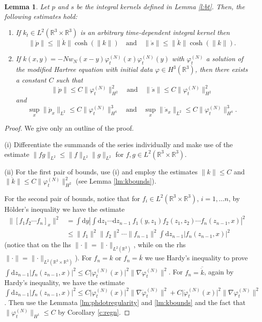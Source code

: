 \documentclass[11pt,a4paper,DIV11]{scrartcl}	%
\newtheorem{lem}[thm]{Lemma}
\newcommand{\di}{\textrm{d}}		%
\newcommand{\cc}[1]{\overline{#1}}	%
\newcommand{\Rbb}{\mathbb{R}}		%
\newcommand{\norm}[1]{\lVert#1\rVert}	%
\newcommand{\ph}{\varphi_t^{(N)}}	%
\newcommand{\phdot}{\dot{\varphi}_t^{(N)}}	%
\newcommand{\bd}{\begin{displaymath}}			%
\newcommand{\ed}{\end{displaymath}}
\begin{document}
\begin{lem}
\label{lem:dottedests1}
Let $p$ and $s$ be the integral kernels defined in Lemma \ref{l:bt}. Then, the following estimates hold:
\begin{enumerate}
\item If $k_t \in L^2(\Rbb^3\times\Rbb^3)$ is an arbitrary time-dependent integral kernel then
\bd
\norm{\dot p} \leq \norm{\dot k} \cosh(\norm{k}) \quad \mbox{and} \quad \norm{\dot s} \leq \norm{\dot k} \cosh(\norm{k}).
\ed
\item If $k(x,y) = - N w_N(x-y) \ph(x) \ph(y)$ with $\ph$ a solution of the modified Hartree equation with initial data $\varphi \in H^3(\Rbb^3)$, then there exists a constant $C$ such that
\bd
\norm{\dot p} \leq C \norm{\ph}_{H^2}^2 \quad \mbox{and} \quad \norm{\dot s} \leq C \norm{\ph}_{H^2}^2
\ed
and
\bd
\sup_x \norm{\dot p_x}_{L^2} \leq C \norm{\ph}_{H^4}^3 \quad \mbox{and} \quad \sup_x \norm{\dot s_x}_{L^2} \leq C \norm{\ph}_{H^4}^3.
\ed
\end{enumerate}
\end{lem}
\begin{proof}
We give only an outline of the proof.

(i) Differentiate the summands of the series individually and make use of the estimate $\norm{fg}_{L^2} \leq \norm{f}_{L^2} \norm{g}_{L^2}$ for $f,g \in L^2(\Rbb^3\times \Rbb^3)$.

(ii) For the first pair of bounds, use (i) and employ the estimates $\norm{k} \leq C$ and $\norm{\dot k} \leq C \norm{\ph}_{H^2}^2$ (see Lemma \ref{lm:kbounds}).

For the second pair of bounds, notice that for $f_i \in L^2(\Rbb^3 \times \Rbb^3)$, $i=1,\dots n$, by H\"older's inequality we have the estimate
\begin{align*}
\norm{\left[ f_1 f_2 \cdots f_n\right]_x}^2 & = \int \di y \left\lvert \int \di z_1 \cdots \di z_{n-1}\ f_1(y,z_1) f_2(z_1,z_2) \cdots f_n(z_{n-1},x) \right\rvert^2 \\
& \leq \norm{f_1}^2 \norm{f_2}^2 \cdots \norm{f_{n-1}}^2 \int \di z_{n-1} \lvert f_n(z_{n-1},x) \rvert^2 
\end{align*}
(notice that on the lhs $\norm{\cdot}= \norm{\cdot}_{L^2(\Rbb^3)}$, while on the rhs $\norm{\cdot} = \norm{\cdot}_{L^2(\Rbb^3\times\Rbb^3)}$).
For $f_n = k$ or $f_n = \cc{k}$ we use Hardy's inequality to prove $\int \di z_{n-1} \lvert f_n(z_{n-1},x) \rvert^2 \leq C \lvert \ph(x) \rvert^2 \norm{\nabla \ph}^2$. For $f_n = \cc{\dot k}$, again by Hardy's inequality, we have the estimate $\int \di z_{n-1} \lvert f_n(z_{n-1},x) \rvert^2 \leq C\lvert \ph(x)\rvert^2 \norm{\nabla \phdot}^2 + C \lvert \phdot(x)\rvert^2 \norm{\nabla \ph}^2$. Then use the Lemmata \ref{lm:phdotregularity} and \ref{lm:kbounds} and the fact that $\norm{\ph}_{H^1} \leq C$ by Corollary \ref{c:regn}.
\end{proof}
\end{document}
